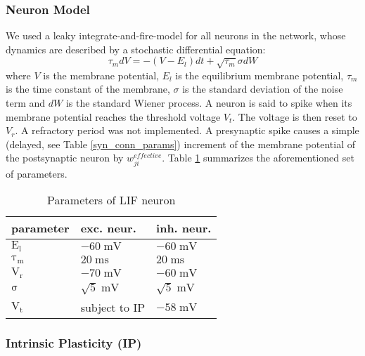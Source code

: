 \documentclass[10pt,a4paper]{article}
\begin{document}
\subsubsection{Neuron Model}
We used a leaky integrate-and-fire-model for all neurons in the network, whose dynamics are described by a stochastic differential equation:
\begin{equation}
{\tau_m}dV = -(V-E_l)dt + \sqrt{\tau_m} \sigma dW
\label{LIF_Dynamics}
\end{equation}
where $V$ is the membrane potential, $E_l$ is the equilibrium membrane potential, $\tau_m$ is the time constant of the membrane, $\sigma$ is the standard deviation of the noise term and $dW$ is the standard Wiener process. A neuron is said to spike when its membrane potential reaches the threshold voltage $V_t$. The voltage is then reset to $V_r$. A refractory period was not implemented. A presynaptic spike causes a simple (delayed, see Table \ref{syn_conn_params}) increment of the membrane potential of the postsynaptic neuron by $w^{effective}_{ji}$. Table \ref{LIF_neuron_params} summarizes the aforementioned set of parameters.
\begin{table}[H]
\begin{tabular}{|l|l|l|}
\hline
\textbf{parameter} & \textbf{exc. neur.} & \textbf{inh. neur.}\\ \hline
$\mathrm{E_l}$ & $\mathrm{-60\;mV}$ & $\mathrm{-60\;mV}$ \\ \hline
$\mathrm{\tau_m}$ & $\mathrm{20\;ms}$ & $\mathrm{20\;ms}$ \\ \hline
$\mathrm{V_r}$ & $\mathrm{-70\;mV}$ & $\mathrm{-60\;mV}$ \\ \hline
$\mathrm{\sigma}$ & $\mathrm{\sqrt{5}\;mV}$ & $\mathrm{\sqrt{5}\;mV}$ \\ \hline
$\mathrm{V_t}$ & subject to IP & $\mathrm{-58\;mV}$ \\ 
\hline
\end{tabular}
\caption{Parameters of LIF neuron}
\label{LIF_neuron_params}
\end{table}   

\subsubsection{Intrinsic Plasticity (IP)}
\end{document}
